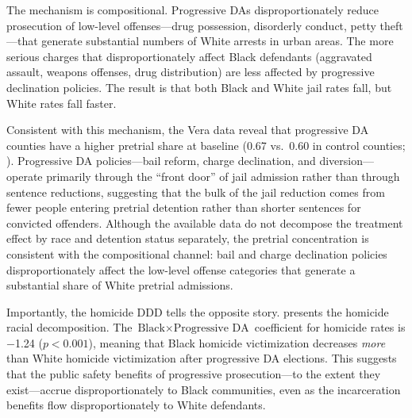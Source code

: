 \documentclass[12pt]{article}
\begin{document}
The mechanism is compositional. Progressive DAs disproportionately reduce prosecution of low-level offenses---drug possession, disorderly conduct, petty theft---that generate substantial numbers of White arrests in urban areas. The more serious charges that disproportionately affect Black defendants (aggravated assault, weapons offenses, drug distribution) are less affected by progressive declination policies. The result is that both Black and White jail rates fall, but White rates fall faster.

Consistent with this mechanism, the Vera data reveal that progressive DA counties have a higher pretrial share at baseline (0.67 vs.\ 0.60 in control counties; ). Progressive DA policies---bail reform, charge declination, and diversion---operate primarily through the ``front door'' of jail admission rather than through sentence reductions, suggesting that the bulk of the jail reduction comes from fewer people entering pretrial detention rather than shorter sentences for convicted offenders. Although the available data do not decompose the treatment effect by race and detention status separately, the pretrial concentration is consistent with the compositional channel: bail and charge declination policies disproportionately affect the low-level offense categories that generate a substantial share of White pretrial admissions.

Importantly, the homicide DDD tells the opposite story.  presents the homicide racial decomposition. The $\text{Black} \times \text{Progressive DA}$ coefficient for homicide rates is $-$1.24 ($p < 0.001$), meaning that Black homicide victimization decreases \textit{more} than White homicide victimization after progressive DA elections. This suggests that the public safety benefits of progressive prosecution---to the extent they exist---accrue disproportionately to Black communities, even as the incarceration benefits flow disproportionately to White defendants.
\end{document}
